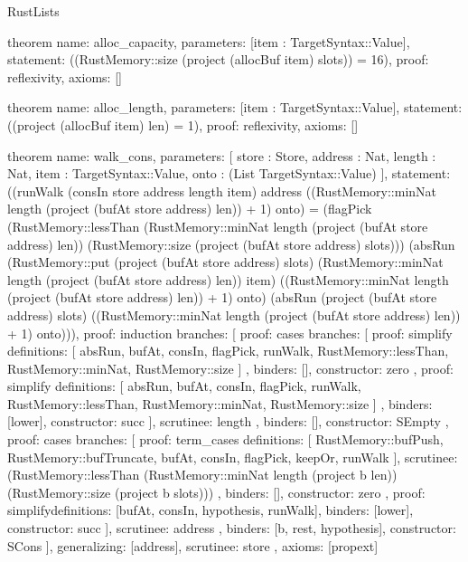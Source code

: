 \begin{lexlean}{RustLists}
\begin{semanticmodule}
theorem{
  name: alloc_capacity,
  parameters: [item : TargetSyntax::Value],
  statement: ((RustMemory::size (project (allocBuf item) slots)) = 16),
  proof: reflexivity{},
  axioms: []
}

theorem{
  name: alloc_length,
  parameters: [item : TargetSyntax::Value],
  statement: ((project (allocBuf item) len) = 1),
  proof: reflexivity{},
  axioms: []
}

theorem{
  name: walk_cons,
  parameters: [
    store : Store,
    address : Nat,
    length : Nat,
    item : TargetSyntax::Value,
    onto : (List TargetSyntax::Value)
  ],
  statement: ((runWalk (consIn store address length item) address ((RustMemory::minNat length (project (bufAt store address) len)) + 1) onto) = (flagPick (RustMemory::lessThan (RustMemory::minNat length (project (bufAt store address) len)) (RustMemory::size (project (bufAt store address) slots))) (absRun (RustMemory::put (project (bufAt store address) slots) (RustMemory::minNat length (project (bufAt store address) len)) item) ((RustMemory::minNat length (project (bufAt store address) len)) + 1) onto) (absRun (project (bufAt store address) slots) ((RustMemory::minNat length (project (bufAt store address) len)) + 1) onto))),
  proof: induction{
    branches: [
      {
        proof: cases{
          branches: [
            {
              proof: simplify{
                definitions: [
                  absRun,
                  bufAt,
                  consIn,
                  flagPick,
                  runWalk,
                  RustMemory::lessThan,
                  RustMemory::minNat,
                  RustMemory::size
                ]
              },
              binders: [],
              constructor: zero
            },
            {
              proof: simplify{
                definitions: [
                  absRun,
                  bufAt,
                  consIn,
                  flagPick,
                  runWalk,
                  RustMemory::lessThan,
                  RustMemory::minNat,
                  RustMemory::size
                ]
              },
              binders: [lower],
              constructor: succ
            }
          ],
          scrutinee: length
        },
        binders: [],
        constructor: SEmpty
      },
      {
        proof: cases{
          branches: [
            {
              proof: term_cases{
                definitions: [
                  RustMemory::bufPush,
                  RustMemory::bufTruncate,
                  bufAt,
                  consIn,
                  flagPick,
                  keepOr,
                  runWalk
                ],
                scrutinee: (RustMemory::lessThan (RustMemory::minNat length (project b len)) (RustMemory::size (project b slots)))
              },
              binders: [],
              constructor: zero
            },
            {
              proof: simplify{definitions: [bufAt, consIn, hypothesis, runWalk]},
              binders: [lower],
              constructor: succ
            }
          ],
          scrutinee: address
        },
        binders: [b, rest, hypothesis],
        constructor: SCons
      }
    ],
    generalizing: [address],
    scrutinee: store
  },
  axioms: [propext]
}


\end{semanticmodule}
\end{lexlean}
